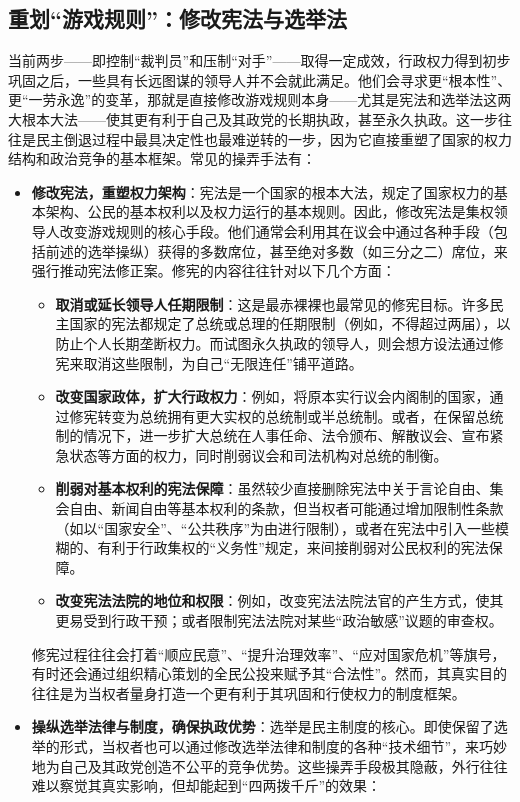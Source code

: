 \documentclass[UTF8, 10pt]{ctexbook}
\begin{document}
\subsection{重划“游戏规则”：修改宪法与选举法}
当前两步——即控制“裁判员”和压制“对手”——取得一定成效，行政权力得到初步巩固之后，一些具有长远图谋的领导人并不会就此满足。他们会寻求更“根本性”、更“一劳永逸”的变革，那就是直接修改游戏规则本身——尤其是宪法和选举法这两大根本大法——使其更有利于自己及其政党的长期执政，甚至永久执政。这一步往往是民主倒退过程中最具决定性也最难逆转的一步，因为它直接重塑了国家的权力结构和政治竞争的基本框架。常见的操弄手法有：
\begin{itemize}
    \item \textbf{修改宪法，重塑权力架构}：宪法是一个国家的根本大法，规定了国家权力的基本架构、公民的基本权利以及权力运行的基本规则。因此，修改宪法是集权领导人改变游戏规则的核心手段。他们通常会利用其在议会中通过各种手段（包括前述的选举操纵）获得的多数席位，甚至绝对多数（如三分之二）席位，来强行推动宪法修正案。修宪的内容往往针对以下几个方面：
        \begin{itemize}
            \item \textbf{取消或延长领导人任期限制}：这是最赤裸裸也最常见的修宪目标。许多民主国家的宪法都规定了总统或总理的任期限制（例如，不得超过两届），以防止个人长期垄断权力。而试图永久执政的领导人，则会想方设法通过修宪来取消这些限制，为自己“无限连任”铺平道路。
            \item \textbf{改变国家政体，扩大行政权力}：例如，将原本实行议会内阁制的国家，通过修宪转变为总统拥有更大实权的总统制或半总统制。或者，在保留总统制的情况下，进一步扩大总统在人事任命、法令颁布、解散议会、宣布紧急状态等方面的权力，同时削弱议会和司法机构对总统的制衡。
            \item \textbf{削弱对基本权利的宪法保障}：虽然较少直接删除宪法中关于言论自由、集会自由、新闻自由等基本权利的条款，但当权者可能通过增加限制性条款（如以“国家安全”、“公共秩序”为由进行限制），或者在宪法中引入一些模糊的、有利于行政集权的“义务性”规定，来间接削弱对公民权利的宪法保障。
            \item \textbf{改变宪法法院的地位和权限}：例如，改变宪法法院法官的产生方式，使其更易受到行政干预；或者限制宪法法院对某些“政治敏感”议题的审查权。
        \end{itemize}
    修宪过程往往会打着“顺应民意”、“提升治理效率”、“应对国家危机”等旗号，有时还会通过组织精心策划的全民公投来赋予其“合法性”。然而，其真实目的往往是为当权者量身打造一个更有利于其巩固和行使权力的制度框架。
    \item \textbf{操纵选举法律与制度，确保执政优势}：选举是民主制度的核心。即使保留了选举的形式，当权者也可以通过修改选举法律和制度的各种“技术细节”，来巧妙地为自己及其政党创造不公平的竞争优势。这些操弄手段极其隐蔽，外行往往难以察觉其真实影响，但却能起到“四两拨千斤”的效果：

\end{itemize}
\end{document}
